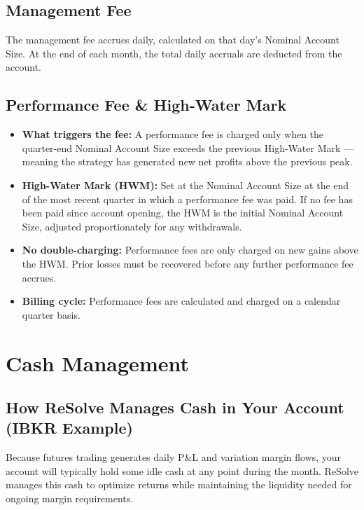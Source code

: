 \documentclass{resolve-whitepaper}
\providecommand{\tightlist}{%
  \setlength{\itemsep}{0pt}\setlength{\parskip}{0pt}}
\begin{document}
\subsection{Management Fee}\label{management-fee}

The management fee accrues daily, calculated on that day's Nominal
Account Size. At the end of each month, the total daily accruals are
deducted from the account.

\subsection{Performance Fee \& High-Water
Mark}\label{performance-fee-high-water-mark}

\begin{itemize}
\tightlist
\item
  \textbf{What triggers the fee:} A performance fee is charged only when
  the quarter-end Nominal Account Size exceeds the previous High-Water
  Mark --- meaning the strategy has generated new net profits above the
  previous peak.
\item
  \textbf{High-Water Mark (HWM):} Set at the Nominal Account Size at the
  end of the most recent quarter in which a performance fee was paid. If
  no fee has been paid since account opening, the HWM is the initial
  Nominal Account Size, adjusted proportionately for any withdrawals.
\item
  \textbf{No double-charging:} Performance fees are only charged on new
  gains above the HWM. Prior losses must be recovered before any further
  performance fee accrues.
\item
  \textbf{Billing cycle:} Performance fees are calculated and charged on
  a calendar quarter basis.
\end{itemize}

\section{Cash Management}\label{cash-management}

\subsection{How ReSolve Manages Cash in Your Account (IBKR
Example)}\label{how-resolve-manages-cash-in-your-account-ibkr-example}

Because futures trading generates daily P\&L and variation margin flows,
your account will typically hold some idle cash at any point during the
month. ReSolve manages this cash to optimize returns while maintaining
the liquidity needed for ongoing margin requirements.
\end{document}
